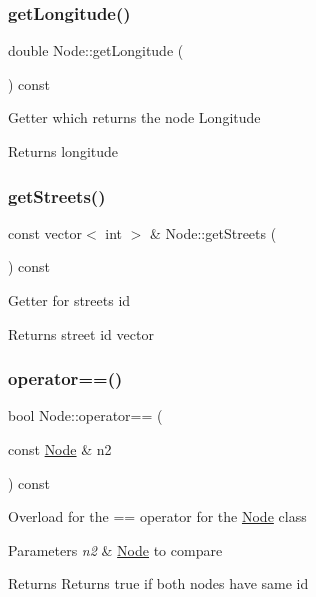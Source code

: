 \subsubsection{\texorpdfstring{get\+Longitude()}{getLongitude()}}
{\footnotesize\ttfamily double Node\+::get\+Longitude (\begin{DoxyParamCaption}{ }\end{DoxyParamCaption}) const}

Getter which returns the node Longitude \begin{DoxyReturn}{Returns}
longitude 
\end{DoxyReturn}
\mbox{\label{class_node_ae96d5a45681f9d0517cf927514aec7f5}} 
\subsubsection{\texorpdfstring{get\+Streets()}{getStreets()}}
{\footnotesize\ttfamily const vector$<$ int $>$ \& Node\+::get\+Streets (\begin{DoxyParamCaption}{ }\end{DoxyParamCaption}) const}

Getter for streets id \begin{DoxyReturn}{Returns}
street id vector 
\end{DoxyReturn}
\mbox{\label{class_node_ad5e2b0cf9850f22ac9668971f66759dc}} 
\subsubsection{\texorpdfstring{operator==()}{operator==()}}
{\footnotesize\ttfamily bool Node\+::operator== (\begin{DoxyParamCaption}\item[{const \mbox{\hyperlink{class_node}{Node}} \&}]{n2 }\end{DoxyParamCaption}) const}

Overload for the \textquotesingle{}==\textquotesingle{} operator for the \mbox{\hyperlink{class_node}{Node}} class 
\begin{DoxyParams}{Parameters}
{\em n2} & \mbox{\hyperlink{class_node}{Node}} to compare \\
\hline
\end{DoxyParams}
\begin{DoxyReturn}{Returns}
Returns true if both nodes have same id 
\end{DoxyReturn}
\mbox{\label{class_node_ac62ad99961481d9e4b21dd4332717927}} 

